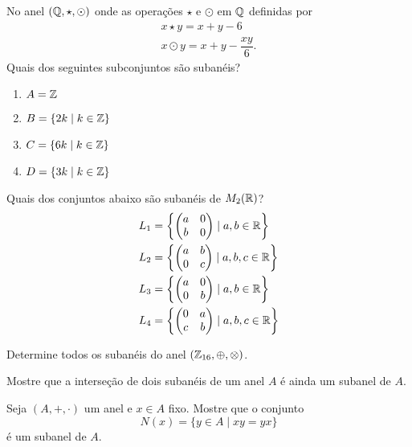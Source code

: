 \documentclass[12pt]{article}
\begin{document}
\vesp

\questao{} No anel $(\mathbb{Q}, \star, \odot)$ onde as opera\c{c}\~oes $\star$ e $\odot$ em $\mathbb{Q}$ definidas por
\begin{align*}
	x \star y = x + y - 6\\
	x \odot y = x + y - \dfrac{xy}{6}.
\end{align*}
Quais dos seguintes subconjuntos são subanéis?
\begin{enumerate}[label=({\alph*})]
	\item $A = \mathbb{Z}$
	\item $B = \{2k \mid k \in \mathbb{Z}\}$
	\item $C = \{6k \mid k \in \mathbb{Z}\}$
	\item $D = \{3k \mid k \in \mathbb{Z}\}$
\end{enumerate}


\vesp

\questao{}
	Quais dos conjuntos abaixo s\~ao suban\'eis de $M_2(\mathbb{R})$?
\begin{align*}
	L_1 &= \left\{\begin{pmatrix}
		a & 0\\
		b & 0
	\end{pmatrix} \mid a, b \in \mathbb{R}\right\}\\
	L_2 &= \left\{\begin{pmatrix}
		a & b\\
		0 & c
	\end{pmatrix} \mid a, b, c \in \mathbb{R}\right\}\\
	L_3 &= \left\{\begin{pmatrix}
		a & 0\\
		0 & b
	\end{pmatrix} \mid a, b \in \mathbb{R}\right\}\\
	L_4 &= \left\{\begin{pmatrix}
		0 & a\\
		c & b
	\end{pmatrix} \mid a, b, c \in \mathbb{R}\right\}
\end{align*}


\vesp

\questao{}
Determine todos os suban\'eis do anel $(\mathbb{Z}_{16}, \oplus, \otimes)$.


\vesp

\questao{}
	Mostre que a interseção de dois subanéis de um anel $A$ é ainda um subanel de $A$.


\vesp

\questao
	Seja $(A, + , \cdot)$ um anel e $x \in A$ fixo. Mostre que o conjunto
	\[
		N(x) = \{y \in A \mid xy = yx\}
	\]
	é um subanel de $A$.
\end{document}
